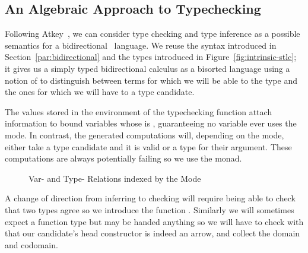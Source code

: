 \subsection{An Algebraic Approach to Typechecking}\label{section:typechecking}

Following Atkey~\citeyear{atkey2015algebraic}, we can consider type checking
and type inference as a possible semantics for a bidirectional~\cite{pierce2000local}
language. We reuse the syntax introduced in Section~\ref{par:bidirectional}
and the types introduced in Figure~\ref{fig:intrinsic-stlc}; it
gives us a simply typed bidirectional calculus as a bisorted language using
a notion of  to distinguish between terms for which we will be able to
 the type and the ones for which we will have to  a type
candidate.

The values stored in the environment of the typechecking function attach 
information to bound variables whose  is , guaranteeing no
variable ever uses the  mode. In contrast, the generated computations
will, depending on the mode, either take a type candidate and  it is
valid or  a type for their argument. These computations are always
potentially failing so we use the  monad.

\begin{figure}[h]
\begin{minipage}[t]{0.40\textwidth}
\end{minipage}\hfill
\begin{minipage}[t]{0.50\textwidth}
\end{minipage}
\caption{Var- and Type- Relations indexed by the Mode}
\end{figure}

A change of direction from inferring to checking will require being able to check
that two types agree so we introduce the function . Similarly we will
sometimes expect a function type but may be handed anything so we will have to check
with  that our candidate's head constructor is indeed an arrow, and
collect the domain and codomain.

